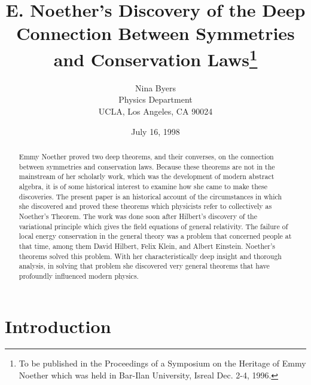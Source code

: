 \documentclass[12pt]{article}
\begin{document}
\title{E. Noether's Discovery of the Deep Connection Between
Symmetries and
                   Conservation Laws\footnote{To be published in
the Proceedings of a
Symposium on the Heritage of Emmy Noether which was held in 
Bar-Ilan University, Isreal Dec. 2-4,
1996.}}


\author{Nina Byers \\Physics
Department\\ UCLA, Los Angeles, CA 90024}
 \date{July 16, 1998}
 \maketitle

\begin{abstract} 
Emmy Noether proved two deep theorems, and their converses, on
 the connection between symmetries and conservation laws. Because these
 theorems are not in the mainstream of her scholarly work, 
  which was the development of modern
 abstract algebra,  it is of some historical interest to examine how
 she came to make these discoveries.  The present paper is an historical account of the
 circumstances in which she  discovered and proved  these theorems which
 physicists refer to collectively as Noether's Theorem.  The work was done 
 soon after  Hilbert's discovery of the variational principle which
 gives the field equations of general relativity.  The failure of local energy
 conservation in the general theory was a problem that concerned people at that
 time, among them David Hilbert, Felix Klein, and Albert Einstein.  Noether's
 theorems solved this problem.  With her characteristically deep insight and
 thorough analysis, in solving that problem she discovered very general theorems
 that have profoundly influenced modern physics. 
 \end{abstract}




\newpage
\section{Introduction} 
\end{document}

